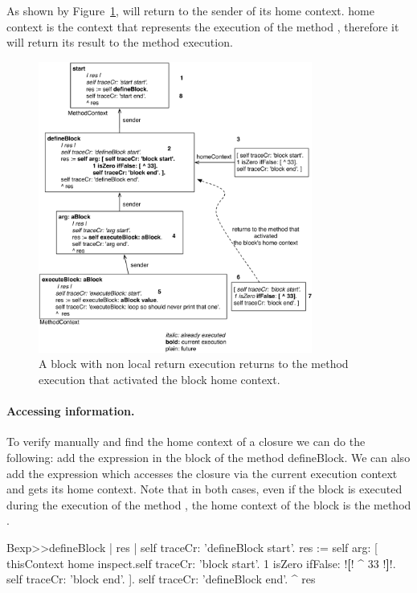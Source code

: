 \documentclass[a4paper,10pt,twoside]{book}
\begin{document}
As shown by Figure~\ref{nonLocalReturn}, \ct{[^3]} will return to the sender of its home context. \ct{[^33]} home context is the context that represents the execution of the method , therefore it will return its result to the method  execution.

\begin{figure}[!h]
\begin{center}\includegraphics[width=9cm]{nonLocalReturn2}
\caption{A block with non local return execution returns to the method execution that activated the block home context.\label{nonLocalReturn}}
\end{center}
\end{figure}


\paragraph{Accessing information.}
To verify manually and find the home context of a closure we can do the following: add the expression  in the block of the  method defineBlock. We can also add the expression  which accesses the closure via the current execution context and gets its home context. Note that in both cases, even if the block is executed during the execution of the method , the home context of the block is the method . 


\begin{code}{}
Bexp>>defineBlock
	| res |
	self traceCr: 'defineBlock start'.
	res := self arg: [ thisContext home inspect.self traceCr: 'block start'. 
                            1 isZero ifFalse: !\textbf{[}! ^ 33 !\textbf{]}!.
                            self traceCr: 'block end'. ].
	self traceCr: 'defineBlock end'.
	^ res
\end{code}
\end{document}
